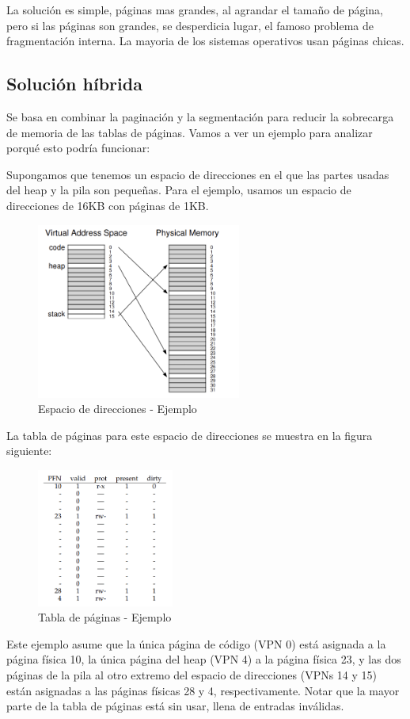 \documentclass{article}
\begin{document}
La solución es simple, páginas mas grandes, al agrandar el tamaño de página, pero si las páginas son grandes, se desperdicia lugar, el famoso problema de fragmentación interna. La mayoria de los sistemas operativos usan páginas chicas. 

\subsection{Solución híbrida}
Se basa en combinar la paginación y la segmentación para reducir la sobrecarga de memoria de las tablas de páginas. Vamos a ver un ejemplo para analizar porqué esto podría funcionar:

Supongamos que tenemos un espacio de direcciones en el que las partes usadas del heap y la pila son pequeñas. Para el ejemplo, usamos un espacio de direcciones de 16KB con páginas de 1KB. 
\begin{figure}[h]
    \centering
    \includegraphics[width=0.6\textwidth]{src/espaciodirecciones.png}
    \caption{Espacio de direcciones - Ejemplo}
\end{figure}
La tabla de páginas para este espacio de direcciones se muestra en la figura siguiente:
\begin{figure}[h]
    \centering
    \includegraphics[width=0.4\textwidth]{src/tabla.png}
    \caption{Tabla de páginas - Ejemplo}
\end{figure}
Este ejemplo asume que la única página de código (VPN 0) está asignada a la página física 10, la única página del heap (VPN 4) a la página física 23, y las dos páginas de la pila al otro extremo del espacio de direcciones (VPNs 14 y 15) están asignadas a las páginas físicas 28 y 4, respectivamente. Notar que la mayor parte de la tabla de páginas está sin usar, llena de entradas inválidas.
\end{document}
